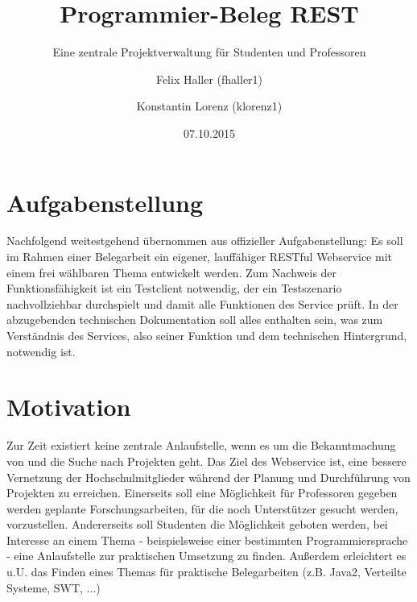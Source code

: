 \documentclass[12pt]{scrartcl}
\begin{document}
	
	
	\subject{Verteilte Systeme}
	\title{Programmier-Beleg REST}
	\subtitle{Eine zentrale Projektverwaltung für Studenten und Professoren}
	\author{Felix Haller (fhaller1) \and Konstantin Lorenz (klorenz1)}
	\date{07.10.2015}
	\publishers{Prüfer: Prof. Dr.-Ing. Andreas Ittner}
	\maketitle
	\thispagestyle{empty} 
	\newpage
	\tableofcontents
	\thispagestyle{empty}
	\newpage	
	\setcounter{page}{1} 
	
	
	
	\section{Aufgabenstellung}
		Nachfolgend weitestgehend übernommen aus offizieller Aufgabenstellung:
		Es soll im Rahmen einer Belegarbeit ein eigener, lauffähiger RESTful Webservice mit einem frei wählbaren Thema entwickelt
		werden. Zum Nachweis der Funktionsfähigkeit ist ein Testclient notwendig, der ein Testszenario nachvollziehbar durchspielt und damit alle Funktionen des Service prüft. In der abzugebenden technischen Dokumentation soll alles enthalten sein, was zum Verständnis des Services, also seiner Funktion und dem technischen Hintergrund, notwendig ist.
		
	\section{Motivation}
		Zur Zeit existiert keine zentrale Anlaufstelle, wenn es um die Bekanntmachung von und die Suche nach Projekten geht. Das Ziel des Webservice ist, eine bessere Vernetzung der Hochschulmitglieder während der Planung und Durchführung von Projekten zu erreichen. Einerseits soll eine Möglichkeit für Professoren gegeben werden geplante Forschungsarbeiten, für die noch Unterstützer gesucht werden, vorzustellen. Andererseits soll Studenten die Möglichkeit geboten werden, bei Interesse an einem Thema - beispielsweise einer bestimmten Programmiersprache - eine Anlaufstelle zur praktischen Umsetzung zu finden. Außerdem erleichtert es u.U. das Finden eines Themas für praktische Belegarbeiten (z.B. Java2, Verteilte Systeme, SWT, ...)
\end{document}
